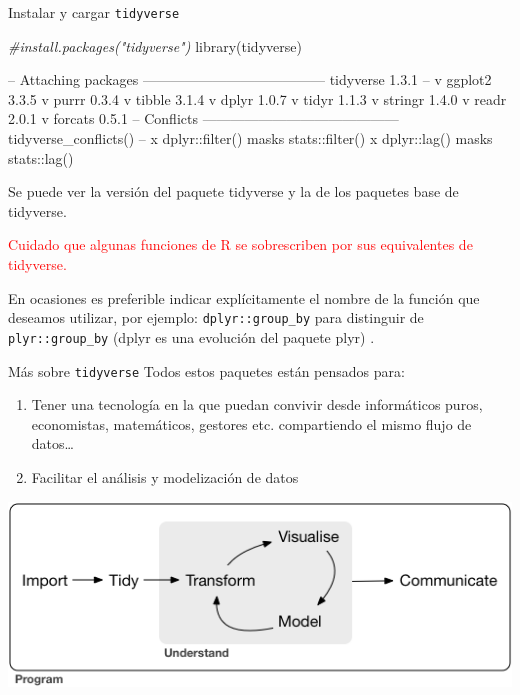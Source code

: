 \documentclass[
  ignorenonframetext,
  aspectratio=169]{beamer}
\newenvironment{Shaded}{\begin{snugshade}}{\end{snugshade}}
\newcommand{\CommentTok}[1]{\textcolor[rgb]{0.56,0.35,0.01}{\textit{#1}}}
\newcommand{\FunctionTok}[1]{\textcolor[rgb]{0.00,0.00,0.00}{#1}}
\newcommand{\NormalTok}[1]{#1}
\let\oldverbatim\verbatim
\let\endoldverbatim\endverbatim
\renewenvironment{verbatim}{\tiny\oldverbatim}{\endoldverbatim}
\newcommand\red[1]{\textcolor{red}{#1}}
\begin{document}
\begin{frame}[fragile]{Instalar y cargar \texttt{tidyverse}}
\protect\hypertarget{instalar-y-cargar-tidyverse}{}
\begin{Shaded}
\begin{Highlighting}[]
\CommentTok{\#install.packages("tidyverse")}
\FunctionTok{library}\NormalTok{(tidyverse)}
\end{Highlighting}
\end{Shaded}

\begin{verbatim}
-- Attaching packages --------------------------------------- tidyverse 1.3.1 --
v ggplot2 3.3.5 v purrr 0.3.4
v tibble 3.1.4 v dplyr 1.0.7
v tidyr 1.1.3 v stringr 1.4.0
v readr 2.0.1 v forcats 0.5.1
-- Conflicts ------------------------------------------ tidyverse_conflicts() --
x dplyr::filter() masks stats::filter()
x dplyr::lag() masks stats::lag()
\end{verbatim}

Se puede ver la versión del paquete tidyverse y la de los paquetes base
de tidyverse.

\red{Cuidado que algunas funciones de R se sobrescriben por sus equivalentes de tidyverse.}

En ocasiones es preferible indicar explícitamente el nombre de la
función que deseamos utilizar, por ejemplo: \texttt{dplyr::group\_by}
para distinguir de \texttt{plyr::group\_by} (dplyr es una evolución del
paquete plyr) .
\end{frame}

\begin{frame}{Más sobre \texttt{tidyverse}}
\protect\hypertarget{muxe1s-sobre-tidyverse}{}
Todos estos paquetes están pensados para:

\begin{enumerate}
\item
  Tener una tecnología en la que puedan convivir desde informáticos
  puros, economistas, matemáticos, gestores etc. compartiendo el mismo
  flujo de datos\ldots{}
\item
  Facilitar el análisis y modelización de datos
\end{enumerate}

\begin{center}\includegraphics[width=0.6\linewidth]{Imgs/data-science} \end{center}
\end{frame}
\end{document}
